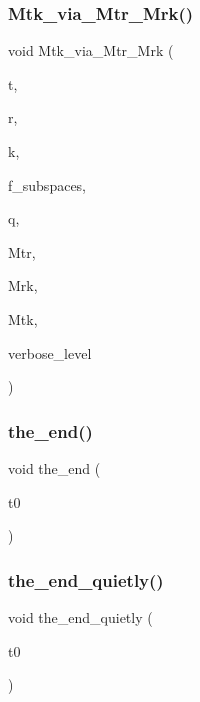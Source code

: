 \subsubsection{\texorpdfstring{Mtk\+\_\+via\+\_\+\+Mtr\+\_\+\+Mrk()}{Mtk\_via\_Mtr\_Mrk()}}
{\footnotesize\ttfamily void Mtk\+\_\+via\+\_\+\+Mtr\+\_\+\+Mrk (\begin{DoxyParamCaption}\item[{\mbox{\hyperlink{galois_8h_a09fddde158a3a20bd2dcadb609de11dc}{I\+NT}}}]{t,  }\item[{\mbox{\hyperlink{galois_8h_a09fddde158a3a20bd2dcadb609de11dc}{I\+NT}}}]{r,  }\item[{\mbox{\hyperlink{galois_8h_a09fddde158a3a20bd2dcadb609de11dc}{I\+NT}}}]{k,  }\item[{\mbox{\hyperlink{galois_8h_a09fddde158a3a20bd2dcadb609de11dc}{I\+NT}}}]{f\+\_\+subspaces,  }\item[{\mbox{\hyperlink{galois_8h_a09fddde158a3a20bd2dcadb609de11dc}{I\+NT}}}]{q,  }\item[{\mbox{\hyperlink{classmatrix}{matrix}} \&}]{Mtr,  }\item[{\mbox{\hyperlink{classmatrix}{matrix}} \&}]{Mrk,  }\item[{\mbox{\hyperlink{classmatrix}{matrix}} \&}]{Mtk,  }\item[{\mbox{\hyperlink{galois_8h_a09fddde158a3a20bd2dcadb609de11dc}{I\+NT}}}]{verbose\+\_\+level }\end{DoxyParamCaption})}

\mbox{\label{discreta__global_8_c_a3ebbd3ccb665a9f78deaa7408577b60c}} 
\subsubsection{\texorpdfstring{the\+\_\+end()}{the\_end()}}
{\footnotesize\ttfamily void the\+\_\+end (\begin{DoxyParamCaption}\item[{\mbox{\hyperlink{galois_8h_a09fddde158a3a20bd2dcadb609de11dc}{I\+NT}}}]{t0 }\end{DoxyParamCaption})}

\mbox{\label{discreta__global_8_c_a4a9acf1e6b9ac9542ac082d98225981a}} 
\subsubsection{\texorpdfstring{the\+\_\+end\+\_\+quietly()}{the\_end\_quietly()}}
{\footnotesize\ttfamily void the\+\_\+end\+\_\+quietly (\begin{DoxyParamCaption}\item[{\mbox{\hyperlink{galois_8h_a09fddde158a3a20bd2dcadb609de11dc}{I\+NT}}}]{t0 }\end{DoxyParamCaption})}

